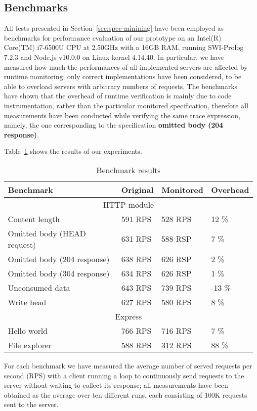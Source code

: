 \subsection{Benchmarks}

All tests presented in Section~\ref{sec:spec-minining} have been employed as benchmarks for performance evaluation
of our prototype on an Intel(R) Core(TM) i7-6500U CPU at 2.50GHz with a 16GB RAM, running SWI-Prolog 7.2.3 and Node.js v10.0.0 on
Linux kernel 4.14.40.
In particular, we have measured how much the performances of all implemented servers are affected by runtime monitoring;
only correct implementations have been considered, to be able to overload servers with arbitrary numbers of requests.
The benchmarks have shown that the overhead of runtime verification is mainly due to code instrumentation, rather than the particular monitored
specification, therefore all measurements have been conducted while verifying the same trace expression, namely, 
the one corresponding to the specification \textbf{omitted body (204 response)}.

Table~\ref{table} shows the results of our experiments. 
\begin{table}[ht]
  \begin{tabular}{|l|l|l|l|}
    \hline
    \textbf{Benchmark} & 
    \textbf{Original} &
    \textbf{Monitored} &
    \textbf{Overhead} \\
    \hline
    \multicolumn{4}{|c|}{HTTP module}\\
    \hline
    Content length & 
    591 RPS &
    528 RPS &
    12 \% \\

    Omitted body (HEAD request)&
    631 RPS &
    588 RSP &
    7 \% \\

    Omitted body (204 response)&
    638 RPS &
    626 RSP &
    2 \% \\

    Omitted body (304 response)&
    634 RPS &
    626 RSP &
    1 \% \\

    Unconsumed data &
    643 RPS &
    739 RPS &
    -13 \% \\

    Write head &
    627 RPS &
    580 RPS &
    8 \% \\
    \hline

    \multicolumn{4}{|c|}{Express}\\
    \hline
    Hello world & 
    766 RPS &
    716 RPS &
    7 \% \\

    File explorer &
    588 RPS &
    312 RPS &
    88 \%\\

    \hline
  \end{tabular}
  \caption{Benchmark results}
  \label{table}
\end{table}
For each benchmark we have measured the average number of served requests per second (RPS) 
with a client running a loop to continuously send requests to the server without waiting to collect its response;
all measurements have been obtained as the average over ten different runs, each consisting
of 100K requests sent to the server.

